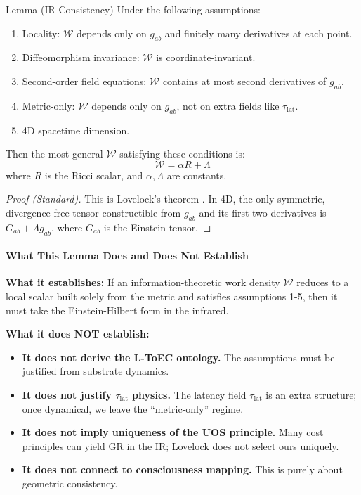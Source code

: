 \documentclass[11pt,titlepage]{article}
\begin{document}
\begin{mytheorem}{Lemma (IR Consistency)}
\label{lemma:lovelock-consistency}
Under the following assumptions:
\begin{enumerate}
    \item Locality: $\mathcal{W}$ depends only on $g_{ab}$ and finitely many derivatives at each point.
    \item Diffeomorphism invariance: $\mathcal{W}$ is coordinate-invariant.
    \item Second-order field equations: $\mathcal{W}$ contains at most second derivatives of $g_{ab}$.
    \item Metric-only: $\mathcal{W}$ depends only on $g_{ab}$, not on extra fields like $\tau_{\mathrm{lat}}$.
    \item 4D spacetime dimension.
\end{enumerate}
Then the most general $\mathcal{W}$ satisfying these conditions is:
\begin{equation}
\mathcal{W} = \alpha R + \Lambda
\end{equation}
where $R$ is the Ricci scalar, and $\alpha, \Lambda$ are constants.
\end{mytheorem}

\begin{proof}[Proof (Standard)]
This is Lovelock's theorem \cite{Lovelock1971, Lovelock1972}. In 4D, the only symmetric, divergence-free tensor constructible from $g_{ab}$ and its first two derivatives is $G_{ab} + \Lambda g_{ab}$, where $G_{ab}$ is the Einstein tensor.
\end{proof}

\paragraph{What This Lemma Does and Does Not Establish}
\begin{tcolorbox}[colback=yellow!5!white,colframe=yellow!75!black,title=Scope and Limitations]
\textbf{What it establishes:} If an information-theoretic work density $\mathcal{W}$ reduces to a local scalar built solely from the metric and satisfies assumptions 1-5, then it must take the Einstein-Hilbert form in the infrared.

\textbf{What it does NOT establish:}
\begin{itemize}
    \item \textbf{It does not derive the L-ToEC ontology.} The assumptions must be justified from substrate dynamics.
    \item \textbf{It does not justify $\tau_{\mathrm{lat}}$ physics.} The latency field $\tau_{\mathrm{lat}}$ is an extra structure; once dynamical, we leave the ``metric-only'' regime.
    \item \textbf{It does not imply uniqueness of the UOS principle.} Many cost principles can yield GR in the IR; Lovelock does not select ours uniquely.
    \item \textbf{It does not connect to consciousness mapping.} This is purely about geometric consistency.
\end{itemize}
\end{tcolorbox}
\end{document}
